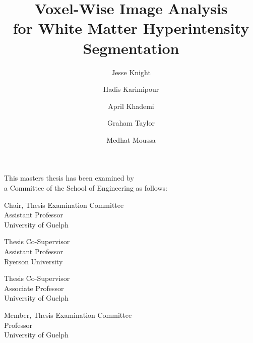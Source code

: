 \title{Voxel-Wise Image Analysis\\for White Matter Hyperintensity Segmentation}
\author{Jesse Knight}
\maketitle
\cleardoublepage{}
\setcounter{page}{1}
\begin{abstractpage}
  
\end{abstractpage}
\cleardoublepage{}
\begin{titlepage}
  \begin{large}
    This masters thesis has been examined by \\ a Committee of the School of Engineering as follows:
    \signature{Hadis Karimipour}{Chair, Thesis Examination Committee \\
      Assistant Professor\\
      University of Guelph}
    \signature{April Khademi}{Thesis Co-Supervisor \\
      Assistant Professor\\
      Ryerson University}
    \signature{Graham Taylor}{Thesis Co-Supervisor \\
      Associate Professor\\
      University of Guelph}
    \signature{Medhat Moussa}{Member, Thesis Examination Committee \\
      Professor\\
      University of Guelph}
  \end{large}
\end{titlepage}
